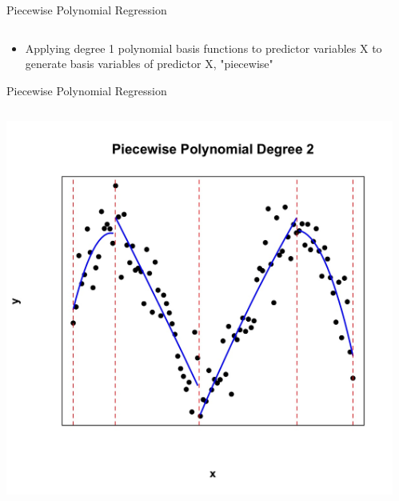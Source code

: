 \documentclass[english]{beamer}
\newcommand{\alertblue}[1]{{\color{blue}#1}}
\begin{document}
\begin{frame}{Piecewise Polynomial Regression}
\begin{columns}
\begin{column}{0.5\textwidth}
          \end{column}      
    \end{columns}
    \begin{itemize}
        \item Applying \alertblue{degree 1 polynomial basis functions} to predictor variables X to generate \alertblue{basis variables of predictor X, "piecewise"}
    \end{itemize}
\end{frame}
\begin{frame}{Piecewise Polynomial Regression}
    
    \begin{columns}
        \begin{column}{0.47\textwidth}
            \centering
            \includegraphics[width=\linewidth]{images/piecewise_degree_2.jpeg} 
        \end{column}
        \begin{column}{0.47\textwidth}
            \centering

\end{column}
\end{columns}
\end{frame}
\end{document}
